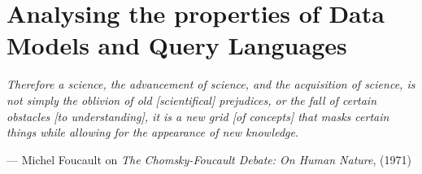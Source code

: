 \chapter{Analysing the properties of Data Models and Query Languages}\label{cha:datadef}


\epigraph{\textit{Therefore a science, the advancement of science, and the acquisition of science, is not simply the oblivion of old [scientifical] prejudices, or the fall of certain obstacles [to understanding], it is a new grid [of concepts] that masks certain things while allowing for the appearance of new knowledge}.}{--- Michel Foucault on \textit{The Chomsky-Foucault Debate: On Human Nature}, (1971)}



